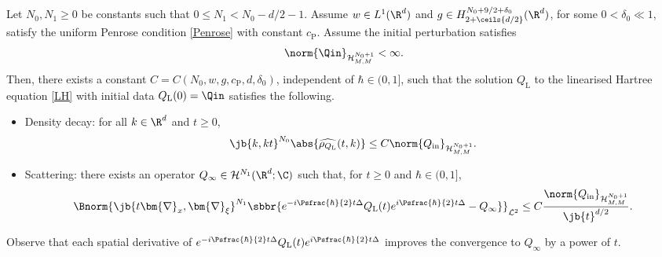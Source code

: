\begin{proposition}
Let $N_0,N_1\geq0$ be constants such that $0\leq N_1<N_0-d/2-1$. Assume $w\in L^1(\R^d)$ and $g\in H^{N_0+9/2+\delta_0}_{2+\ceils{d/2}}(\R^d)$, for some $0<\delta_0\ll 1$, satisfy the uniform Penrose condition \eqref{Penrose} with constant ${c_{\mathrm{P}}}$. Assume the initial perturbation satisfies \[\norm{\Qin}_{\mathcal H^{N_0+1}_{M,M}}<\infty.\] Then, there exists a constant $C=C(N_0,w,g,{c_{\mathrm{P}}},d,\delta_0)$, independent of $\hbar\in (0,1]$, such that the solution ${Q_{\mathrm{L}}}$ to the linearised Hartree equation \eqref{LH} with initial data ${Q_{\mathrm{L}}}(0)=\Qin$ satisfies the following.
\begin{itemize}
\item Density decay: for all $k\in\R^d$ and $t\geq0$,
\begin{align*}
\jb{k, kt}^{N_0}\abs{\widehat{\rho_{Q_{\mathrm{L}}}}(t,k)}\leq C\norm{Q_{\mathrm{in}}}_{\mathcal H^{N_0+1}_{M,M}}.
\end{align*}
\item Scattering: there exists an operator $Q_\infty\in \mathcal H^{N_1}(\R^d;\C)$ such that, for $t\geq 0$ and $\hbar\in (0,1]$,\vspace*{-3pt}
\begin{align}\label{scatteringstatement}
\Bnorm{\jb{t\bm{\nabla}_{x}, \bm{\nabla}_\xi}^{N_1}\sbbr{e^{-i\Psfrac{\hbar}{2}t\Delta}{Q_{\mathrm{L}}}(t)e^{i\Psfrac{\hbar}{2}t\Delta}-Q_\infty}}_{\mathcal L^2}\leq C\frac{\norm{Q_{\mathrm{in}}}_{\mathcal H^{N_0+1}_{M,M}}}{\jb{t}^{d/2}}.
\end{align}
\end{itemize}
\end{proposition}\begin{remark}
Observe that each spatial derivative of $e^{-i\Psfrac{\hbar}{2}t\Delta}{Q_{\mathrm{L}}}(t)e^{i\Psfrac{\hbar}{2}t\Delta}$ improves the convergence to $Q_\infty$ by a power of $t$.
\end{remark}
